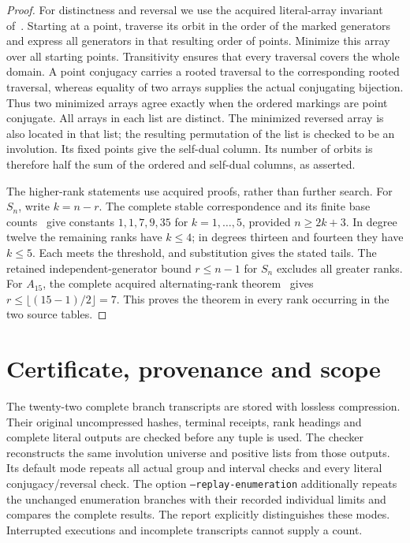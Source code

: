 \documentclass[10pt,a4paper]{article}
\begin{document}
\begin{proof}
For distinctness and reversal we use the acquired literal-array invariant
of~\cite{eleven}. Starting at a point, traverse its orbit in the order of
the marked generators and express all generators in that resulting order
of points. Minimize this array over all starting points. Transitivity
ensures that every traversal covers the whole domain. A point conjugacy
carries a rooted traversal to the corresponding rooted traversal, whereas
equality of two arrays supplies the actual conjugating bijection. Thus
two minimized arrays agree exactly when the ordered markings are point
conjugate. All arrays in each list are distinct. The minimized reversed
array is also located in that list; the resulting permutation of the list
is checked to be an involution. Its fixed points give the self-dual column.
Its number of orbits is therefore half the sum of the ordered and
self-dual columns, as asserted.

The higher-rank statements use acquired proofs, rather than further
search. For $S_n$, write $k=n-r$. The complete stable correspondence and
its finite base counts~\cite{stable} give constants $1,1,7,9,35$ for
$k=1,\ldots,5$, provided $n\ge2k+3$. In degree twelve the remaining
ranks have $k\le4$; in degrees thirteen and fourteen they have $k\le5$.
Each meets the threshold, and substitution gives the stated tails.
The retained independent-generator bound $r\le n-1$ for $S_n$ excludes
all greater ranks. For $A_{15}$, the complete acquired alternating-rank
theorem~\cite{alternating} gives
$r\le\lfloor(15-1)/2\rfloor=7$. This proves the theorem in every rank
occurring in the two source tables.
\end{proof}

\section*{Certificate, provenance and scope}
The twenty-two complete branch transcripts are stored with lossless
compression. Their original uncompressed hashes, terminal receipts,
rank headings and complete literal outputs are checked before any tuple
is used. The checker reconstructs the same involution universe and positive
lists from those outputs. Its default mode repeats all actual group and
interval checks and every literal conjugacy/reversal check. The option
\texttt{--replay-enumeration} additionally repeats the unchanged enumeration
branches with their recorded individual limits and compares the complete
results. The report explicitly distinguishes these modes. Interrupted
executions and incomplete transcripts cannot supply a count.
\end{document}
